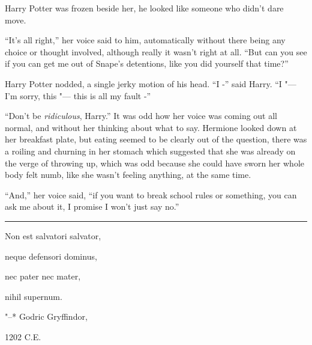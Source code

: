 Harry Potter was frozen beside her, he looked like someone who didn't
dare move.

``It's all right,'' her voice said to him, automatically without there
being any choice or thought involved, although really it wasn't right at
all. ``But can you see if you can get me out of Snape's detentions, like
you did yourself that time?''

Harry Potter nodded, a single jerky motion of his head. ``I -'' said
Harry. ``I "--- I'm sorry, this "--- this is all my fault -''

``Don't be \emph{ridiculous}, Harry.'' It was odd how her voice was
coming out all normal, and without her thinking about what to say.
Hermione looked down at her breakfast plate, but eating seemed to be
clearly out of the question, there was a roiling and churning in her
stomach which suggested that she was already on the verge of throwing
up, which was odd because she could have sworn her whole body felt numb,
like she wasn't feeling anything, at the same time.

``And,'' her voice said, ``if you want to break school rules or
something, you can ask me about it, I promise I won't just say no.''

\begin{center}\rule{3in}{0.4pt}\end{center}

Non est salvatori salvator,

neque defensori dominus,

nec pater nec mater,

nihil supernum.

"--* Godric Gryffindor,

1202 C.E.
